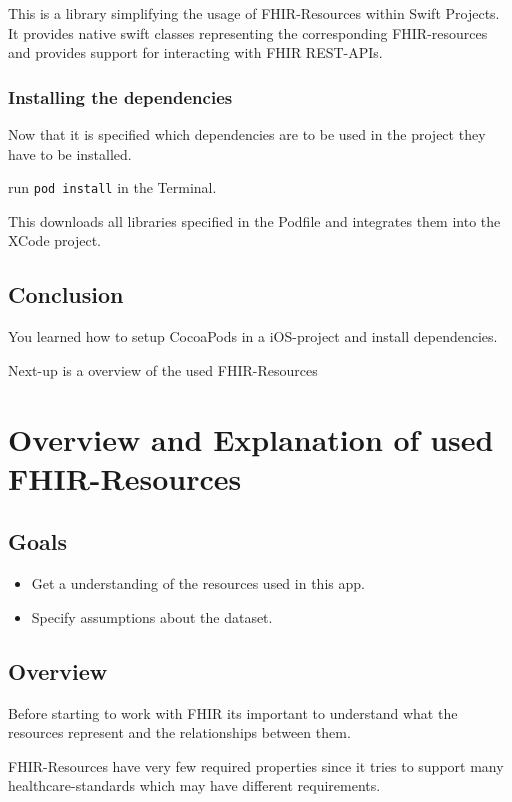 \documentclass{article}
\begin{document}
This is a library simplifying the usage of FHIR-Resources within Swift
Projects.
\\
It provides native swift classes representing the corresponding FHIR-resources and provides support for interacting with FHIR REST-APIs.

\subsubsection{Installing the dependencies}
Now that it is specified which dependencies are to be used in the project they have to be installed.

run \texttt{pod\ install} in the Terminal.

This downloads all libraries specified in the Podfile and integrates
them into the XCode project.

\subsection{Conclusion}\label{step2:conclusion}

You learned how to setup CocoaPods in a iOS-project and install
dependencies.

Next-up is a overview of the used FHIR-Resources

\section{Overview and Explanation of used
FHIR-Resources}\label{step3:overview}

\subsection{Goals}\label{step3:goals}

\begin{itemize}

\item
  Get a understanding of the resources used in this app.
\item
  Specify assumptions about the dataset.
\end{itemize}

\subsection{Overview}\label{overview}
Before starting to work with FHIR its important to understand what the resources represent and the relationships between them.

FHIR-Resources have very few required properties since it tries to
support many healthcare-standards which may have different requirements.
\end{document}
